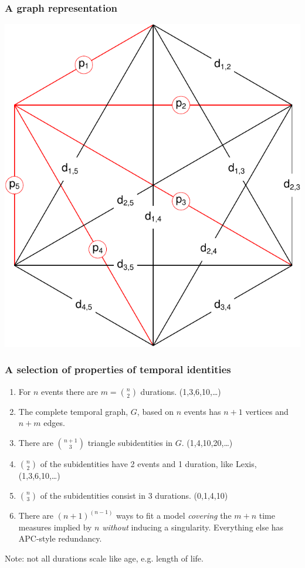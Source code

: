 \documentclass[20pt]{beamer}
\begin{document}
\begin{frame}
\frametitle{A graph representation}
\centering
\includegraphics[scale=1.1]{Figures/edgep5.pdf}\\
\end{frame}

\begin{frame}
\frametitle{A selection of properties of temporal identities}
\begin{enumerate}
  \item For $n$ events there are $m = \binom{n}{2}$ durations. (1,3,6,10,\ldots)
  \item The complete temporal graph, $G$, based on $n$ events has $n+1$ vertices
  and $n+m$ edges.
  \item There are $\binom{n+1}{3}$ triangle subidentities in $G$.
  (1,4,10,20,\ldots)
  \item $\binom{n}{2}$ of the subidentities have 2 events and 1 duration,
  like Lexis,  (1,3,6,10,\ldots)
  \item $\binom{n}{3}$ of the subidentities consist in 3 durations. (0,1,4,10)
  \item There are $(n+1)^{(n-1)}$ ways to fit a model \emph{covering} the $m+n$
  time measures implied by $n$ \emph{without} inducing a singularity. Everything else has
  APC-style redundancy.
\end{enumerate}
Note: not all durations scale like age, e.g. length of life. 
\end{frame}
\end{document}
